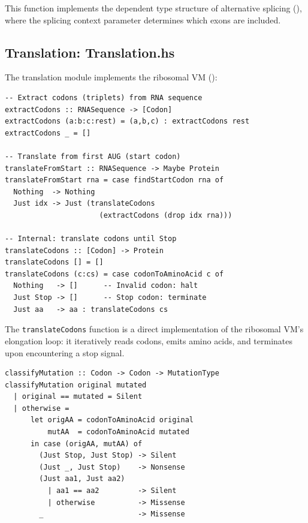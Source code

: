 \documentclass[12pt,a4paper]{article}
\theoremstyle{definition}
\begin{document}
This function implements the dependent type structure of alternative splicing (), where the splicing context parameter determines which exons are included.

\subsection{Translation: Translation.hs}\label{sec:impl-translation}

The translation module implements the ribosomal VM ():

\begin{lstlisting}[caption={Translation implementation (Translation.hs)},label=lst:translation]
-- Extract codons (triplets) from RNA sequence
extractCodons :: RNASequence -> [Codon]
extractCodons (a:b:c:rest) = (a,b,c) : extractCodons rest
extractCodons _ = []

-- Translate from first AUG (start codon)
translateFromStart :: RNASequence -> Maybe Protein
translateFromStart rna = case findStartCodon rna of
  Nothing  -> Nothing
  Just idx -> Just (translateCodons
                      (extractCodons (drop idx rna)))

-- Internal: translate codons until Stop
translateCodons :: [Codon] -> Protein
translateCodons [] = []
translateCodons (c:cs) = case codonToAminoAcid c of
  Nothing   -> []      -- Invalid codon: halt
  Just Stop -> []      -- Stop codon: terminate
  Just aa   -> aa : translateCodons cs
\end{lstlisting}

The \texttt{translateCodons} function is a direct implementation of the ribosomal VM's elongation loop: it iteratively reads codons, emits amino acids, and terminates upon encountering a stop signal.

\begin{lstlisting}[caption={Mutation classification (Translation.hs)},label=lst:mutation-classify]
classifyMutation :: Codon -> Codon -> MutationType
classifyMutation original mutated
  | original == mutated = Silent
  | otherwise =
      let origAA = codonToAminoAcid original
          mutAA  = codonToAminoAcid mutated
      in case (origAA, mutAA) of
        (Just Stop, Just Stop) -> Silent
        (Just _, Just Stop)    -> Nonsense
        (Just aa1, Just aa2)
          | aa1 == aa2         -> Silent
          | otherwise          -> Missense
        _                      -> Missense
\end{lstlisting}
\end{document}
